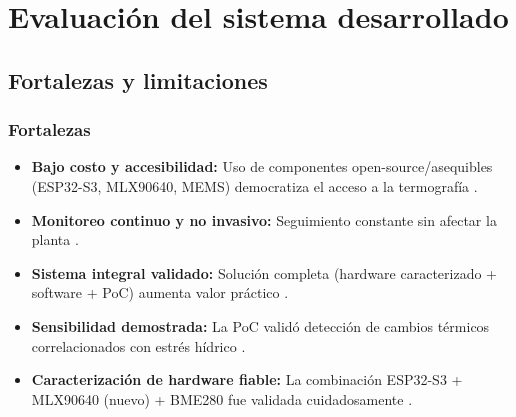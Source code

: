  \section{Evaluación del sistema desarrollado}
 \label{sec:evaluacion_sistema_desarrolado}

\subsection{Fortalezas y limitaciones}
\label{subsec:fortalezas_limitaciones}

\subsubsection*{Fortalezas}
\begin{itemize}
    \item \textbf{Bajo costo y accesibilidad:} Uso de componentes open-source/asequibles (ESP32-S3, MLX90640, MEMS) democratiza el acceso a la termografía .
    \item \textbf{Monitoreo continuo y no invasivo:} Seguimiento constante sin afectar la planta .
    \item \textbf{Sistema integral validado:} Solución completa (hardware caracterizado + software + PoC) aumenta valor práctico .
    \item \textbf{Sensibilidad demostrada:} La PoC validó detección de cambios térmicos correlacionados con estrés hídrico .
    \item \textbf{Caracterización de hardware fiable:} La combinación ESP32-S3 + MLX90640 (nuevo) + BME280 fue validada cuidadosamente .
\end{itemize}

